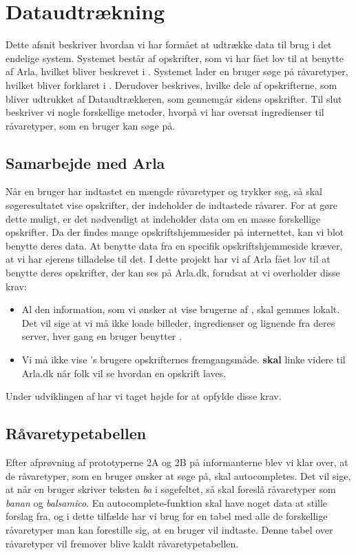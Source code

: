 \section{Dataudtrækning}
Dette afsnit beskriver hvordan vi har formået at udtrække data til brug i det endelige system. Systemet består af opskrifter, som vi har fået lov til at benytte af Arla, hvilket bliver beskrevet i . Systemet lader en bruger søge på råvaretyper, hvilket bliver forklaret i . Derudover beskrives, hvilke dele af opskrifterne, som bliver udtrukket af Dataudtrækkeren, som gennemgår sidens opskrifter. Til slut beskriver vi nogle forskellige metoder, hvorpå vi har oversat ingredienser til råvaretyper, som en bruger kan søge på.

\subsection{Samarbejde med Arla}
\label{sec:samarla}
Når en bruger har indtastet en mængde råvaretyper og trykker søg, så skal søgeresultatet vise opskrifter, der indeholder de indtastede råvarer. For at gøre dette muligt, er det nødvendigt at \Foodl{} indeholder data om en masse forskellige opskrifter. Da der findes mange opskriftshjemmesider på internettet, kan vi blot benytte deres data. At benytte data fra en specifik opskriftshjemmeside kræver, at vi har ejerens tilladelse til det. I dette projekt har vi af Arla fået lov til at benytte deres opskrifter, der kan ses på Arla.dk, forudsat at vi overholder disse krav:

\begin{itemize}
\item Al den information, som vi ønsker at vise brugerne af \Foodl, skal gemmes lokalt. Det vil sige at vi må ikke loade billeder, ingredienser og lignende fra deres server, hver gang en bruger benytter \Foodl.
\item Vi må ikke vise \Foodl{}'s brugere opskrifternes fremgangsmåde. \Foodl{} \textbf{skal} linke videre til Arla.dk når folk vil se hvordan en opskrift laves.
\end{itemize}
Under udviklingen af \Foodl{} har vi taget højde for at opfylde disse krav.

\subsection{Råvaretypetabellen}
\label{sec:raavare}
Efter afprøvning af prototyperne 2A og 2B på informanterne blev vi klar over, at de råvaretyper, som en bruger ønsker at søge på, skal autocompletes. Det vil sige, at når en bruger skriver teksten \textit{ba} i søgefeltet, så skal \Foodl{} foreslå råvaretyper som \fx \textit{banan} og \textit{balsamico}.
En autocomplete-funktion skal have noget data at stille forslag fra, og i dette tilfælde har vi brug for en tabel med alle de forskellige råvaretyper man kan forestille sig, at en bruger vil indtaste. Denne tabel over råvaretyper vil fremover blive kaldt råvaretypetabellen.

